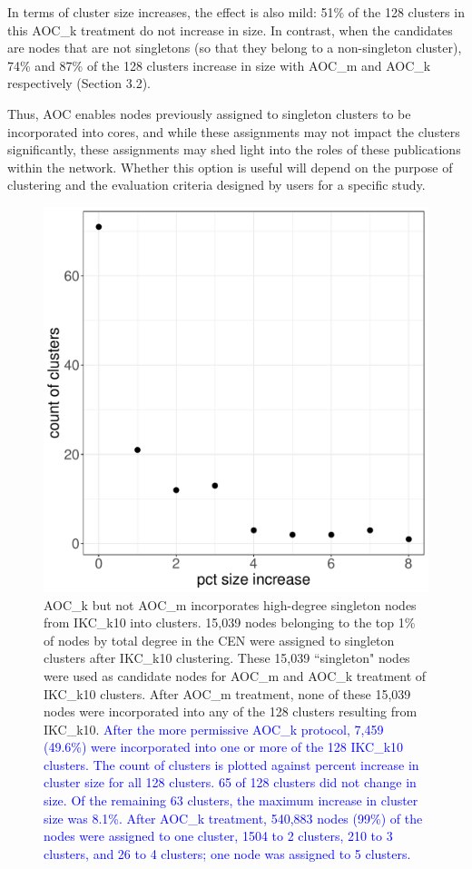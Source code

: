 \documentclass[12pt, oneside]{article}   	%
\begin{document}
In terms of cluster size increases, the effect is also mild: 51\% of the 128 clusters in this AOC\_k treatment do not increase in size. In contrast, when the candidates are nodes that are not singletons (so that they belong to a non-singleton cluster), 74\% and 87\% of the 128 clusters increase in size with AOC\_m and AOC\_k respectively  (Section 3.2).  

Thus, AOC enables nodes previously assigned to singleton clusters to  be incorporated into cores, and while these assignments may not impact the clusters significantly, these assignments may shed light into the roles of these publications within the network.  Whether this option is useful will depend on the purpose of clustering and the evaluation criteria designed by users for a specific study.

\begin{figure}
\centering
\includegraphics[width=0.6\linewidth]{bl_singletons.pdf} 
\captionsetup{width=0.9\textwidth}
\caption{AOC\_k but not AOC\_m incorporates high-degree singleton nodes from IKC\_k10 into clusters. 15,039 nodes belonging to the top  1\% of nodes by total degree in the CEN were assigned to singleton clusters after IKC\_k10 clustering. These 15,039  ``singleton" nodes were used as candidate nodes for AOC\_m and AOC\_k treatment of IKC\_k10 clusters. After AOC\_m treatment, none of these 15,039 nodes were incorporated into any of the 128 clusters resulting from  IKC\_k10. \textcolor{blue}{After the more permissive AOC\_k protocol, 7,459 (49.6\%) were incorporated into one or more of the 128 IKC\_k10 clusters. The count of clusters is plotted against percent increase in cluster size for all 128 clusters. 65 of 128 clusters did not change in size. Of the remaining 63 clusters, the maximum increase in cluster size was 8.1\%.  After AOC\_k treatment, 540,883 nodes (99\%) of the nodes were assigned to one cluster, 1504 to 2 clusters, 210 to 3 clusters, and 26 to 4 clusters; one node was assigned to 5 clusters.}
\label{fig:singleton}}
\end{figure}
	
\end{document}
